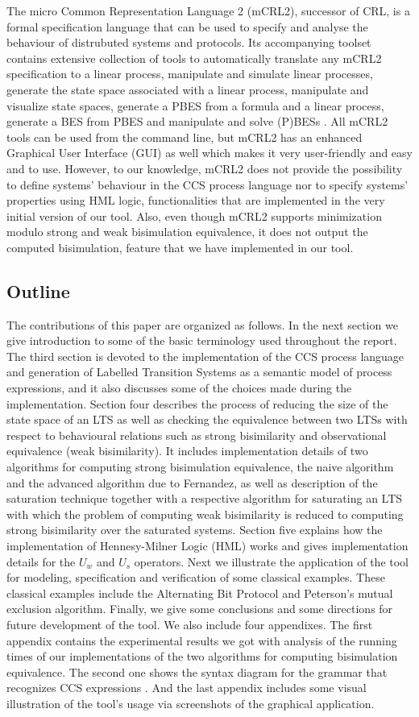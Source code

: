 The micro Common Representation Language 2 (mCRL2), successor of CRL, is a formal specification language that can be used to specify and analyse the behaviour of distrubuted systems and protocols. Its accompanying toolset contains extensive collection of tools to automatically translate any mCRL2 specification to a linear process, manipulate and simulate linear processes, generate the state space associated with a linear process, manipulate and visualize state spaces, generate a PBES from a formula and a linear process, generate a BES from PBES and manipulate and solve (P)BESs \cite{mCRL2}. All mCRL2 tools can be used from the command line, but mCRL2 has an enhanced Graphical User Interface (GUI) as well which makes it very user-friendly and easy and to use. However, to our knowledge, mCRL2 does not provide the possibility to define systems' behaviour in the CCS process language nor to specify systems' properties using HML logic, functionalities that are implemented in the very initial version of our tool. Also, even though mCRL2 supports minimization modulo strong and weak bisimulation equivalence, it does not output the computed bisimulation, feature that we have implemented in our tool.
 
\subsection{Outline} The contributions of this paper are organized as follows. In the next section we give introduction to some of the basic terminology used throughout the report. The third section is devoted to the implementation of the CCS process language and generation of Labelled Transition Systems as a semantic model of process expressions, and it also discusses some of the choices made during the implementation. Section four describes the process of reducing the size of the state space of an LTS as well as checking the equivalence between two LTSs with respect to behavioural relations such as strong bisimilarity and observational equivalence (weak bisimilarity). It includes implementation details of two algorithms for computing strong bisimulation equivalence, the naive algorithm and the advanced algorithm due to Fernandez, as well as description of the saturation technique together with a respective algorithm  for saturating an LTS with which the problem of computing weak bisimilarity is reduced to computing strong bisimilarity over the saturated systems. Section five explains how the implementation of Hennesy-Milner Logic (HML) works and gives implementation details for the $U_{w}$ and $U_{s}$ operators. Next we illustrate the application of the tool for modeling, specification and verification of some classical examples. These classical examples include the Alternating Bit Protocol and Peterson's mutual exclusion algorithm. Finally, we give some conclusions and some directions for future development of the tool. We also include four appendixes. The first appendix contains the experimental results we got with analysis of the running times of our implementations of the two algorithms for computing bisimulation equivalence. The second one shows the syntax diagram for the grammar that recognizes CCS expressions . And the last appendix includes some visual illustration of the tool's usage via screenshots of the graphical application.
